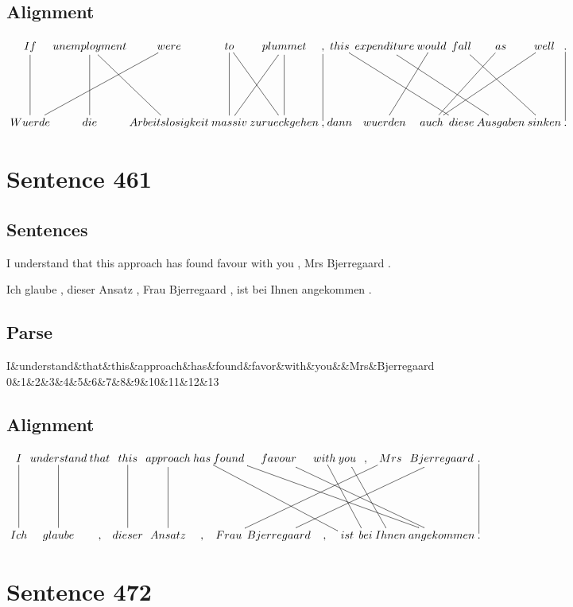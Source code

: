\documentclass{report}
\begin{document}
\subsection*{Alignment}
\scriptsize{
$
\xymatrix@C-2.3pc{
If \ar @{-} [dd] & unemployment \ar @{-} [ddr] \ar @{-} [dd] & were \ar @{-} [ddll] & to \ar @{-} [dd] \ar @{-} [ddr] & plummet \ar @{-} [dd] \ar @{-} [ddl] & , \ar @{-} [dd] & this \ar @{-} [ddrrr] & expenditure \ar @{-} [ddrrr] & would \ar @{-} [ddl] & fall \ar @{-} [ddrr] & as \ar @{-} [ddll] & well \ar @{-} [ddlll] & . \ar @{-} [dd]\\\\
Wuerde & die & Arbeitslosigkeit & massiv & zurueckgehen & , & dann & wuerden & auch & diese & Ausgaben & sinken & .
}$}
\newpage\section*{Sentence 461}

\subsection*{Sentences}
I understand that this approach has found favour with you , Mrs Bjerregaard .

\noindent Ich glaube , dieser Ansatz , Frau Bjerregaard , ist bei Ihnen angekommen .



\subsection*{Parse}
\begin{dependency}[theme=simple]
\begin{deptext}[column sep=.5cm, row sep=.1ex]
I\&understand\&that\&this\&approach\&has\&found\&favor\&with\&you\&\&Mrs\&Bjerregaard\\
0\&1\&2\&3\&4\&5\&6\&7\&8\&9\&10\&11\&12\&13\\
\end{deptext}
\end{dependency}


\subsection*{Alignment}
\scriptsize{
$
\xymatrix@C-2.3pc{
I \ar @{-} [dd] & understand \ar @{-} [dd] & that & this \ar @{-} [dd] & approach \ar @{-} [dd] & has \ar @{-} [ddrrrr] & found \ar @{-} [ddrrrrrr] & favour \ar @{-} [ddrrrrr] & with \ar @{-} [ddrr] & you \ar @{-} [ddrr] & , & Mrs \ar @{-} [ddlllll] & Bjerregaard \ar @{-} [ddlllll] & . \ar @{-} [dd]\\\\
Ich & glaube & , & dieser & Ansatz & , & Frau & Bjerregaard & , & ist & bei & Ihnen & angekommen & .
}$}
\newpage\section*{Sentence 472}
\end{document}
